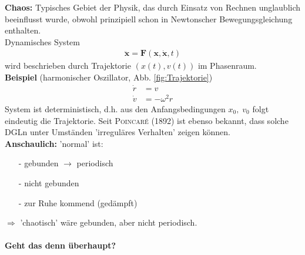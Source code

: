 \documentclass[12pt]{article}
\begin{document}
\textbf{Chaos:} Typisches Gebiet der Physik, das durch Einsatz von Rechnen unglaublich %
beeinflusst wurde, obwohl prinzipiell schon in Newtonscher Bewegungsgleichung enthalten. \\
Dynamisches System
\begin{align*}
\ddot{\mathbf{x}} = \mathbf{F} (\mathbf{x}, \mathbf{\dot{x}}, t)
\end{align*}
wird beschrieben durch Trajektorie $(x(t), v(t))$ im Phasenraum. \\

\textbf{Beispiel} (harmonischer Oszillator, Abb. \ref{fig:Trajektorie})
\begin{align*}
\dot{r} &= v \\
\dot{v} &= - \omega^2 r
\end{align*}
System ist deterministisch, d.h. aus den Anfangsbedingungen $x_0, \; v_0$ folgt eindeutig die Trajektorie. Seit \textsc{Poincaré} (1892) ist ebenso bekannt, dass solche DGLn unter Umständen 'irreguläres Verhalten' zeigen können. \\
\textbf{Anschaulich:} 'normal' ist:
\begin{itemize}
\item[-] gebunden $\to$ periodisch
\item[-] nicht gebunden
\item[-] zur Ruhe kommend (gedämpft)
\end{itemize}
$\Rightarrow$ 'chaotisch' wäre gebunden, aber nicht periodisch. \\
\paragraph{Geht das denn überhaupt?}
\end{document}
